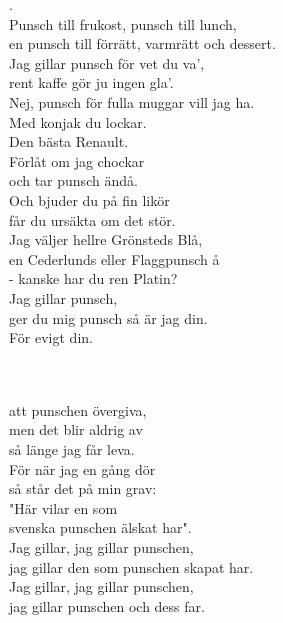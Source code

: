 . \\ 
Punsch till frukost, punsch till lunch, \\ 
en punsch till förrätt, varmrätt och dessert. \\ 
Jag gillar punsch för vet du va', \\ 
rent kaffe gör ju ingen gla'. \\ 
Nej, punsch för fulla muggar vill jag ha. \\ 
Med konjak du lockar. \\ 
Den bästa Renault. \\ 
Förlåt om jag chockar \\ 
och tar punsch ändå. \\ 
Och bjuder du på fin likör \\ 
får du ursäkta om det stör. \\ 
Jag väljer hellre Grönsteds Blå, \\ 
en Cederlunds eller Flaggpunsch å \\ 
- kanske har du ren Platin? \\ 
Jag gillar punsch, \\ 
ger du mig punsch så är jag din. \\ 
För evigt din. \\ 

\newpage


\vspace{0.15cm}
\melochtext{} \\
\\ 
att punschen övergiva,\\ 
men det blir aldrig av\\ 
så länge jag får leva.\\ 
För när jag en gång dör\\ 
så står det på min grav:\\ 
"Här vilar en som\\ 
svenska punschen älskat har".\\ 
Jag gillar, jag gillar punschen,\\ 
jag gillar den som punschen skapat har.\\ 
Jag gillar, jag gillar punschen,\\ 
jag gillar punschen och dess far. 

 \\
 
